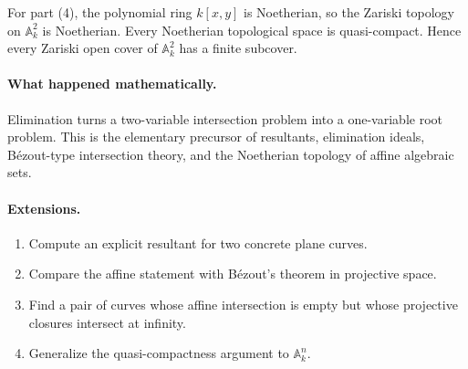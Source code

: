 For part (4), the polynomial ring \(k[x,y]\) is Noetherian, so the Zariski topology on
\(\mathbb A_k^2\) is Noetherian.  Every Noetherian topological space is quasi-compact.
Hence every Zariski open cover of \(\mathbb A_k^2\) has a finite subcover.

\paragraph{What happened mathematically.}
Elimination turns a two-variable intersection problem into a one-variable root problem.
This is the elementary precursor of resultants, elimination ideals, Bézout-type intersection
theory, and the Noetherian topology of affine algebraic sets.

\paragraph{Extensions.}
\begin{enumerate}
\item Compute an explicit resultant for two concrete plane curves.
\item Compare the affine statement with Bézout's theorem in projective space.
\item Find a pair of curves whose affine intersection is empty but whose projective closures
intersect at infinity.
\item Generalize the quasi-compactness argument to \(\mathbb A_k^n\).
\end{enumerate}
\fi
